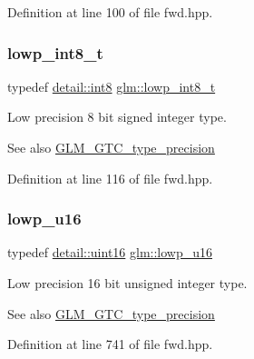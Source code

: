 Definition at line 100 of file fwd.\+hpp.

\mbox{\label{group__gtc__type__precision_gae6092311f6970a305c2df19a372360a3}} 
\subsubsection{\texorpdfstring{lowp\_int8\_t}{lowp\_int8\_t}}
{\footnotesize\ttfamily typedef \mbox{\hyperlink{namespaceglm_1_1detail_a04b526a8d7a9b455602a0afa78c531e0}{detail\+::int8}} \mbox{\hyperlink{group__gtc__type__precision_gae6092311f6970a305c2df19a372360a3}{glm\+::lowp\+\_\+int8\+\_\+t}}}

Low precision 8 bit signed integer type. \begin{DoxySeeAlso}{See also}
\mbox{\hyperlink{group__gtc__type__precision}{G\+L\+M\+\_\+\+G\+T\+C\+\_\+type\+\_\+precision}} 
\end{DoxySeeAlso}


Definition at line 116 of file fwd.\+hpp.

\mbox{\label{group__gtc__type__precision_ga22c5364f27caa0a6eb0627cbc21e46be}} 
\subsubsection{\texorpdfstring{lowp\_u16}{lowp\_u16}}
{\footnotesize\ttfamily typedef \mbox{\hyperlink{namespaceglm_1_1detail_a47b2a7d006d187338e8031a352d1ce56}{detail\+::uint16}} \mbox{\hyperlink{group__gtc__type__precision_ga22c5364f27caa0a6eb0627cbc21e46be}{glm\+::lowp\+\_\+u16}}}

Low precision 16 bit unsigned integer type. \begin{DoxySeeAlso}{See also}
\mbox{\hyperlink{group__gtc__type__precision}{G\+L\+M\+\_\+\+G\+T\+C\+\_\+type\+\_\+precision}} 
\end{DoxySeeAlso}


Definition at line 741 of file fwd.\+hpp.

\mbox{\label{group__gtc__type__precision_gaba06fae1dd98ca50c017e68345df0365}} 

